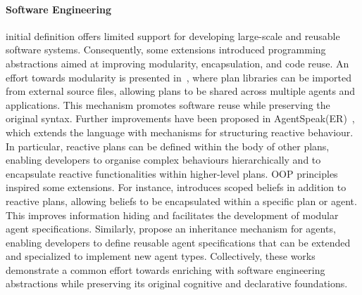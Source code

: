 \paragraph{Software Engineering}
\agentspeak{} initial definition offers limited support for developing large-scale and reusable software systems. 
%
Consequently, 
some extensions introduced programming abstractions aimed at improving modularity, 
encapsulation, 
and code reuse.
%
An effort towards modularity is presented in~\cite{agentspeak-extension-modularity}, 
where plan libraries can be imported from external source files, 
allowing plans to be shared across multiple agents and applications. 
%
This mechanism promotes software reuse 
while preserving the original \agentspeak{} syntax.
%
Further improvements have been proposed in AgentSpeak(ER)~\cite{ricci2018atal}, 
which extends the language with mechanisms for structuring reactive behaviour. 
%
In particular, 
reactive plans can be defined within the body of other plans, 
enabling developers to organise complex behaviours hierarchically and to encapsulate reactive functionalities within higher-level plans.
%
\ac{OOP} principles inspired some \agentspeak{} extensions. 
%
For instance, 
\cite{croatti2016agere} introduces scoped beliefs in addition to reactive plans, 
allowing beliefs to be encapsulated within a specific plan or agent. 
%
This improves information hiding and facilitates the development of modular agent specifications. 
%
Similarly, 
\cite{agentspeak-extension-collier} propose an inheritance mechanism for \agentspeak{} agents, 
enabling developers to define reusable agent specifications that can be extended and specialized to implement new agent types. 
%
Collectively, 
these works demonstrate a common effort towards enriching \agentspeak{} with software engineering abstractions while preserving its original cognitive and declarative foundations.


